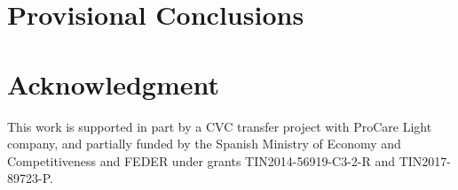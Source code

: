 \documentclass[10pt,a4paper,twocolumn,twoside]{article}
\begin{document}
	\section{Provisional Conclusions}
	
	

	\section{Acknowledgment}
	This work is supported in part by a CVC transfer project with ProCare Light company, and partially funded by the Spanish Ministry of Economy and Competitiveness and FEDER under grants TIN2014-56919-C3-2-R and TIN2017-89723-P.
	
	
	

	\appendix
\end{document}
